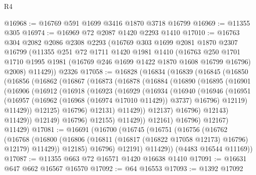 \begin{lexlean}{R4}
\begin{coremodule}
@16968 := @16769 @591 @1699 @3416 @1870 @3718 @16799
@16969 := @11355 @305
@16974 := @16969 @72 @2087 @1420 @2293 @1410
@17010 := @16763
    @304
    @2082
    @2086
    @2308
    @2293
    (@16769
      @303
      @1699
      @2081
      @1870
      @2307
      @16799
      (@11355
        @251
        @72
        @1711
        @1420
        @1981
        @1410
        (@16763
          @250
          @1701
          @1710
          @1995
          @1981
          (@16769 @246 @1699 @1422 @1870 @1608 @16799 @16796)
          @2008)
        @11429))
    @2326
@17058 := @16828
    (@16834
      (@16839
        (@16845
          (@16850
            (@16856
              (@16862
                (@16867
                  (@16873
                    (@16878
                      (@16884
                        (@16890
                          (@16895
                            (@16901
                              (@16906
                                (@16912
                                  (@16918
                                    (@16923
                                      (@16929
                                        (@16934
                                          (@16940
                                            (@16946
                                              (@16951
                                                (@16957
                                                  (@16962 (@16968 (@16974 @17010 @11429)) @3737)
                                                  @16796)
                                                @12119)
                                              @11429))
                                          @12125)
                                        @16796)
                                      @12131)
                                    @11429))
                                @12137)
                              @16796)
                            @12143)
                          @11429))
                      @12149)
                    @16796)
                  @12155)
                @11429))
            @12161)
          @16796)
        @12167)
      @11429)
@17081 := @16691
    (@16700
      (@16745
        (@16751
          (@16756
            (@16762
              (@16768
                (@16800 (@16806 (@16811 (@16817 (@16822 @17058 @12173) @16796) @12179) @11429))
                @12185)
              @16796)
            @12191)
          @11429))
      (@4483 @16544 @11169))
@17087 := @11355 @663 @72 @16571 @1420 @16638 @1410
@17091 := @16631 @647 @662 @16567 @16570
@17092 := @64 @16553
@17093 := @1392 @17092

\end{coremodule}
\end{lexlean}
